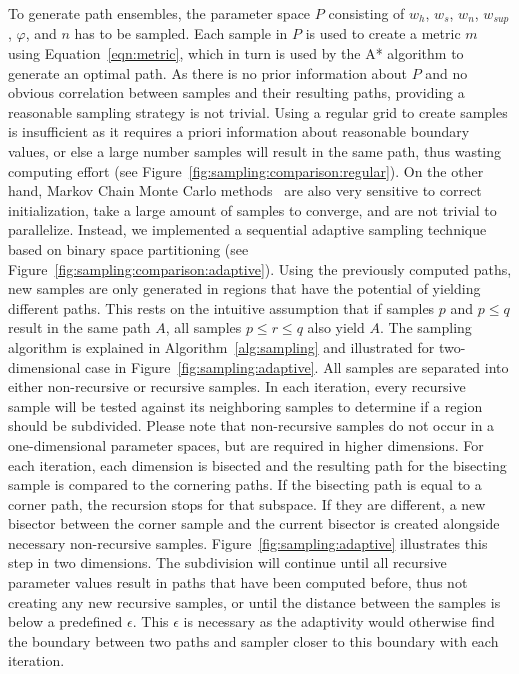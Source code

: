 \documentclass{egpubl}
\begin{document}
To generate path ensembles, the parameter space $P$ consisting of $w_h$, $w_s$, $w_n$, $w_{sup}$, $\varphi$, and $n$ has to be sampled. Each sample in $P$ is used to create a metric $m$ using Equation~\ref{eqn:metric}, which in turn is used by the A* algorithm to generate an optimal path. As there is no prior information about $P$ and no obvious correlation between samples and their resulting paths, providing a reasonable sampling strategy is not trivial. Using a regular grid to create samples is insufficient as it requires a priori information about reasonable boundary values, or else a large number samples will result in the same path, thus wasting computing effort (see Figure~\ref{fig:sampling:comparison:regular}). On the other hand, Markov Chain Monte Carlo methods~\cite{gilks2005markov} are also very sensitive to correct initialization, take a large amount of samples to converge, and are not trivial to parallelize. Instead, we implemented a sequential adaptive sampling technique based on binary space partitioning (see Figure~\ref{fig:sampling:comparison:adaptive}). Using the previously computed paths, new samples are only generated in regions that have the potential of yielding different paths. This rests on the intuitive assumption that if samples $p$ and $p \le q$ result in the same path $A$, all samples $p \leq r \leq q$ also yield $A$. The sampling algorithm is explained in Algorithm~\ref{alg:sampling} and illustrated for two-dimensional case in Figure~\ref{fig:sampling:adaptive}. All samples are separated into either non-recursive or recursive samples. In each iteration, every recursive sample will be tested against its neighboring samples to determine if a region should be subdivided. Please note that non-recursive samples do not occur in a one-dimensional parameter spaces, but are required in higher dimensions. For each iteration, each dimension is bisected and the resulting path for the bisecting sample is compared to the cornering paths. If the bisecting path is equal to a corner path, the recursion stops for that subspace. If they are different, a new bisector between the corner sample and the current bisector is created alongside necessary non-recursive samples. Figure~\ref{fig:sampling:adaptive} illustrates this step in two dimensions. The subdivision will continue until all recursive parameter values result in paths that have been computed before, thus not creating any new recursive samples, or until the distance between the samples is below a predefined $\epsilon$. This $\epsilon$ is necessary as the adaptivity would otherwise find the boundary between two paths and sampler closer to this boundary with each iteration.
\end{document}
